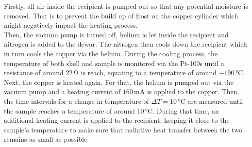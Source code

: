 Firstly, all air inside the recipient is pumped out so that any potential moisture is removed. That is to prevent the build up of frost on the copper cylinder which might negatively impact the heating process. \\
Then, the vacuum pump is turned off, helium is let inside the recipient and nitrogen is added to the dewar.
The nitrogen then cools down the recipient which in turn cools the copper via the helium.
During the cooling process, the temperature of both shell and sample is monitored via the Pt-100s until a resistance of around $22 \,\si{\ohm}$ is reach, equating to a temperature of around $-190 \,\si{\celsius}$. \\

Next, the copper is heated again. For that, the helium is pumped out via the vacuum pump and a heating current of $160 \,\si{\milli\ampere}$ is applied to the copper.
Then, the time intervals for a change in temperature of $\Delta T = 10 \,\si{\celsius}$ are measured until the sample reaches a temperature of around $10 \,\si{\celsius}$.
During that time, an additional heating current is applied to the recipient, keeping it close to the sample's temperature to make sure that radiative heat transfer between the two remains as small as possible.